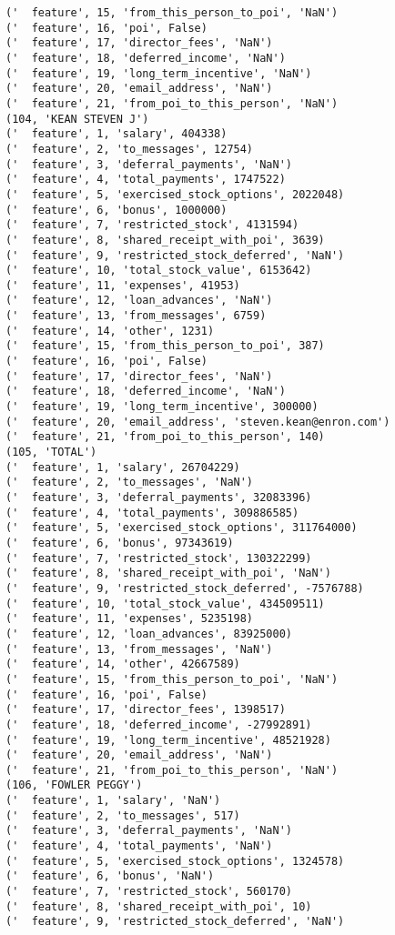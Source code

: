 \begin{verbatim}
('  feature', 15, 'from_this_person_to_poi', 'NaN')
('  feature', 16, 'poi', False)
('  feature', 17, 'director_fees', 'NaN')
('  feature', 18, 'deferred_income', 'NaN')
('  feature', 19, 'long_term_incentive', 'NaN')
('  feature', 20, 'email_address', 'NaN')
('  feature', 21, 'from_poi_to_this_person', 'NaN')
(104, 'KEAN STEVEN J')
('  feature', 1, 'salary', 404338)
('  feature', 2, 'to_messages', 12754)
('  feature', 3, 'deferral_payments', 'NaN')
('  feature', 4, 'total_payments', 1747522)
('  feature', 5, 'exercised_stock_options', 2022048)
('  feature', 6, 'bonus', 1000000)
('  feature', 7, 'restricted_stock', 4131594)
('  feature', 8, 'shared_receipt_with_poi', 3639)
('  feature', 9, 'restricted_stock_deferred', 'NaN')
('  feature', 10, 'total_stock_value', 6153642)
('  feature', 11, 'expenses', 41953)
('  feature', 12, 'loan_advances', 'NaN')
('  feature', 13, 'from_messages', 6759)
('  feature', 14, 'other', 1231)
('  feature', 15, 'from_this_person_to_poi', 387)
('  feature', 16, 'poi', False)
('  feature', 17, 'director_fees', 'NaN')
('  feature', 18, 'deferred_income', 'NaN')
('  feature', 19, 'long_term_incentive', 300000)
('  feature', 20, 'email_address', 'steven.kean@enron.com')
('  feature', 21, 'from_poi_to_this_person', 140)
(105, 'TOTAL')
('  feature', 1, 'salary', 26704229)
('  feature', 2, 'to_messages', 'NaN')
('  feature', 3, 'deferral_payments', 32083396)
('  feature', 4, 'total_payments', 309886585)
('  feature', 5, 'exercised_stock_options', 311764000)
('  feature', 6, 'bonus', 97343619)
('  feature', 7, 'restricted_stock', 130322299)
('  feature', 8, 'shared_receipt_with_poi', 'NaN')
('  feature', 9, 'restricted_stock_deferred', -7576788)
('  feature', 10, 'total_stock_value', 434509511)
('  feature', 11, 'expenses', 5235198)
('  feature', 12, 'loan_advances', 83925000)
('  feature', 13, 'from_messages', 'NaN')
('  feature', 14, 'other', 42667589)
('  feature', 15, 'from_this_person_to_poi', 'NaN')
('  feature', 16, 'poi', False)
('  feature', 17, 'director_fees', 1398517)
('  feature', 18, 'deferred_income', -27992891)
('  feature', 19, 'long_term_incentive', 48521928)
('  feature', 20, 'email_address', 'NaN')
('  feature', 21, 'from_poi_to_this_person', 'NaN')
(106, 'FOWLER PEGGY')
('  feature', 1, 'salary', 'NaN')
('  feature', 2, 'to_messages', 517)
('  feature', 3, 'deferral_payments', 'NaN')
('  feature', 4, 'total_payments', 'NaN')
('  feature', 5, 'exercised_stock_options', 1324578)
('  feature', 6, 'bonus', 'NaN')
('  feature', 7, 'restricted_stock', 560170)
('  feature', 8, 'shared_receipt_with_poi', 10)
('  feature', 9, 'restricted_stock_deferred', 'NaN')

\end{verbatim}

